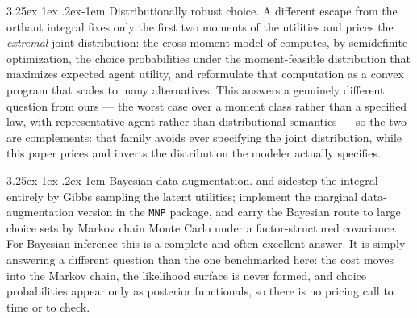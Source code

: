 \documentclass[11pt]{article}
\makeatletter
\renewcommand\paragraph{\@startsection{paragraph}{4}{\z@}%
  {3.25ex \@plus1ex \@minus.2ex}{-1em}%
  {\normalfont\normalsize\itshape}}
\makeatother
\begin{document}
\paragraph{Distributionally robust choice.} A different escape from the
orthant integral fixes only the first two moments of the utilities and
prices the \emph{extremal} joint distribution: the cross-moment model of
\citet{mishra2012} computes, by semidefinite optimization, the choice
probabilities under the moment-feasible distribution that maximizes
expected agent utility, and \citet{ahipasaoglu2019} reformulate that
computation as a convex program that scales to many alternatives. This
answers a genuinely different question from ours --- the worst case over
a moment class rather than a specified law, with representative-agent
rather than distributional semantics --- so the two are complements: that
family avoids ever specifying the joint distribution, while this paper
prices and inverts the distribution the modeler actually specifies.

\paragraph{Bayesian data augmentation.} \citet{albert1993} and
\citet{mcculloch1994} sidestep the integral entirely by Gibbs sampling the latent
utilities; \citet{imai2005} implement the marginal data-augmentation version
in the \texttt{MNP} package, and \citet{loaizamaya2022} carry the Bayesian
route to large choice sets by Markov chain Monte Carlo under a factor-structured covariance. For Bayesian inference
this is a complete and often excellent answer. It is simply answering a different question than the
one benchmarked here: the cost moves into the Markov chain, the likelihood
surface is never formed, and choice probabilities appear only as posterior
functionals, so there is no pricing call to time or to check.
\end{document}
